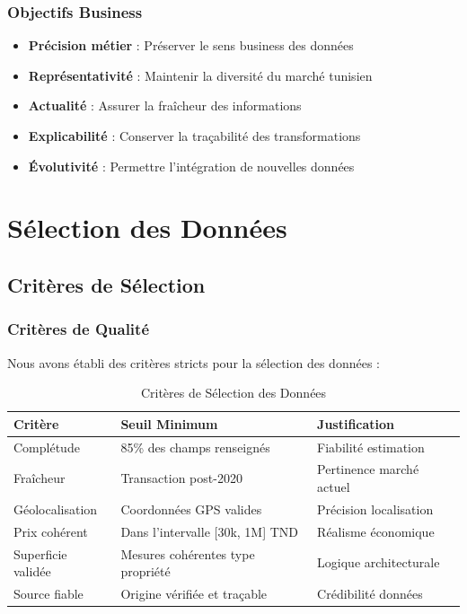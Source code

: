 \subsubsection{Objectifs Business}

\begin{itemize}
    \item \textbf{Précision métier} : Préserver le sens business des données
    \item \textbf{Représentativité} : Maintenir la diversité du marché tunisien
    \item \textbf{Actualité} : Assurer la fraîcheur des informations
    \item \textbf{Explicabilité} : Conserver la traçabilité des transformations
    \item \textbf{Évolutivité} : Permettre l'intégration de nouvelles données
\end{itemize}

\section{Sélection des Données}
\label{sec:selection_donnees}

\subsection{Critères de Sélection}
\label{subsec:criteres_selection}

\subsubsection{Critères de Qualité}

Nous avons établi des critères stricts pour la sélection des données :

\begin{table}[H]
\centering
\caption{Critères de Sélection des Données}
\begin{tabular}{|l|l|l|}
\hline
\textbf{Critère} & \textbf{Seuil Minimum} & \textbf{Justification} \\
\hline
Complétude & 85\% des champs renseignés & Fiabilité estimation \\
\hline
Fraîcheur & Transaction post-2020 & Pertinence marché actuel \\
\hline
Géolocalisation & Coordonnées GPS valides & Précision localisation \\
\hline
Prix cohérent & Dans l'intervalle [30k, 1M] TND & Réalisme économique \\
\hline
Superficie validée & Mesures cohérentes type propriété & Logique architecturale \\
\hline
Source fiable & Origine vérifiée et traçable & Crédibilité données \\
\hline
\end{tabular}
\label{tab:criteres_selection}
\end{table}

